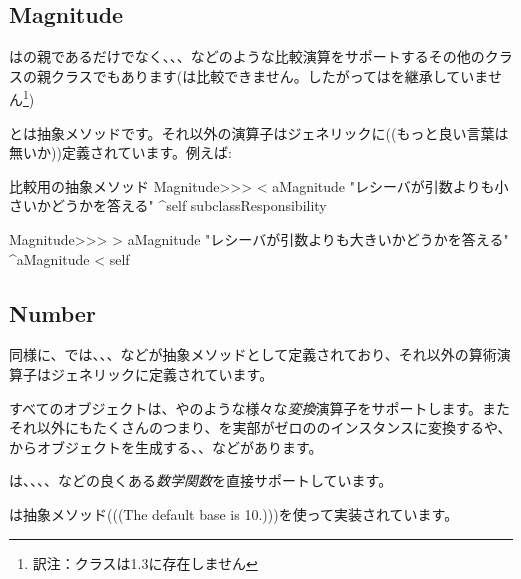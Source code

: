 \documentclass[a4paper,10pt,twoside]{book}
\begin{document}
\subsection{Magnitude}

はの親であるだけでなく、、、などのような比較演算をサポートするその他のクラスの親クラスでもあります(は比較できません。したがってはを継承していません\footnote{訳注：クラスは\pharo 1.3に存在しません})

とは抽象メソッドです。それ以外の演算子はジェネリックに((もっと良い言葉は無いか))定義されています。例えば:

\begin{method}{比較用の抽象メソッド}
Magnitude>>> < aMagnitude 
    "レシーバが引数よりも小さいかどうかを答える"
    ^self subclassResponsibility

Magnitude>>> > aMagnitude 
    "レシーバが引数よりも大きいかどうかを答える"
    ^aMagnitude < self
\end{method}

\subsection{Number}

同様に、では、、、などが抽象メソッドとして定義されており、それ以外の算術演算子はジェネリックに定義されています。

すべてのオブジェクトは、やのような様々な\emph{変換}演算子をサポートします。またそれ以外にもたくさんのつまり、を実部がゼロののインスタンスに変換するや、からオブジェクトを生成する、、などがあります。

は、、、、などの良くある\emph{数学関数}を直接サポートしています。

は抽象メソッド(((The default base is 10.)))を使って実装されています。
\end{document}
